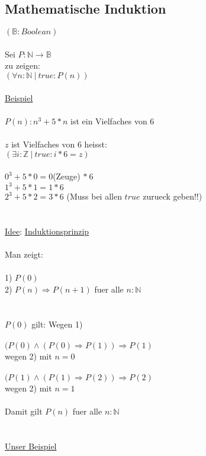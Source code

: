 \documentclass[18pt,a4paper]{article}
\newcommand{\tab}{\hspace*{2em}}
\begin{document}
\subsection{Mathematische Induktion}

$(\mathbb{B}: Boolean)$\\
\\
Sei $P : \mathbb{N} \rightarrow \mathbb{B}$\\
zu zeigen:\\
$(\forall{n} : \mathbb{N} \:\vert\: true : P(n) )$\\
\\
\uline{Beispiel}\\
\\
$P(n): n^3 + 5*n$ ist ein Vielfaches von $6$\\
\\
$z$ ist Vielfaches von $6$ heisst:\\
$(\exists{i} : \mathbb{Z} \:\vert\: true : i*6  = z)$\\
\\
$0^3 + 5*0 = 0$(Zeuge) $*\:6$\\
$1^3 + 5*1 = 1*6$\\
$2^3 + 5*2 = 3*6$  (Muss bei allen $true$ zurueck geben!!)\\
\\
\\
\uline{Idee}: \uline{Induktionsprinzip}\\
\\
Man zeigt:\\
\\
1) $P(0)$\\
2) $P(n) \Rightarrow P(n+1)$ fuer alle $n : \mathbb{N}$\\
\\
\\
$P(0)$ gilt: Wegen 1)\\
\\
$(P(0) \wedge (P(0) \Rightarrow P(1)) \Rightarrow P(1)$\\
\tab wegen 2) mit $n=0$\\
\\
$(P(1) \wedge (P(1) \Rightarrow P(2)) \Rightarrow P(2)$\\
\tab wegen 2) mit $n=1$\\
\\
Damit gilt $P(n)$ fuer alle $n:\mathbb{N}$\\
\\
\\
\uline{Unser Beispiel}\\
\end{document}
